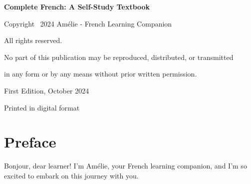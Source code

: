 



\makecover

\thispagestyle{empty}
\begin{center}
\vspace*{2cm}
{\headingfont\Large\bfseries Complete French: A Self-Study Textbook\par}
\vspace{1cm}
{\headingfont\normalsize Copyright \textcopyright\ 2024 Amélie - French Learning Companion\par}
\vspace{0.5cm}
{\headingfont\small All rights reserved.\par}
\vspace{0.5cm}
{\headingfont\small No part of this publication may be reproduced, distributed, or transmitted\par}
{\headingfont\small in any form or by any means without prior written permission.\par}
\vfill
{\headingfont\small First Edition, October 2024\par}
{\headingfont\small Printed in digital format\par}
\end{center}

\clearpage

\setcounter{page}{1}
\tableofcontents
{}

\clearpage

\listoffigures
{}

\clearpage

\listoftables
{}

\clearpage

\chapter*{Preface}

\begin{center}

\end{center}

Bonjour, dear learner! I'm Amélie, your French learning companion, and I'm so excited to embark on this journey with you.

